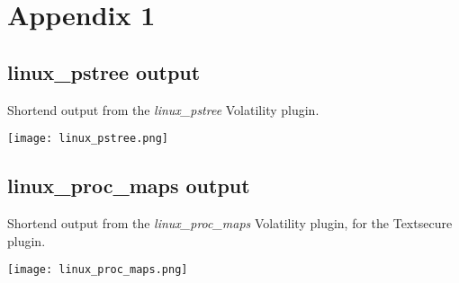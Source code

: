 \section{Appendix 1}

\subsection{linux\_pstree output}\label{pstree}
Shortend output from the \textit{linux\_pstree} Volatility plugin.

\texttt{[image: linux\_pstree.png]}


\subsection{linux\_proc\_maps output}\label{procmaps}
Shortend output from the \textit{linux\_proc\_maps} Volatility plugin, for the
Textsecure plugin.

\texttt{[image: linux\_proc\_maps.png]}
